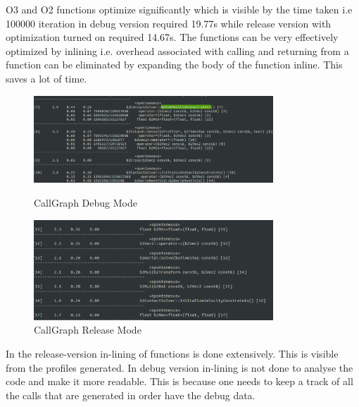 \documentclass[a4paper,11pt]{article}
\begin{document}
\begin{itemize}
O3 and O2 functions optimize significantly which is visible by the time taken i.e 100000 iteration in debug version required 19.77s while release version with optimization turned on required 14.67s.
The functions can be very effectively optimized by inlining i.e. overhead associated with calling and returning from a function can be eliminated by expanding the body of the function inline. This saves a lot of time.\\
\begin{figure}[ht]
	\begin{minipage}[ht]{0.5\linewidth}
	\includegraphics[width=90mm]{1.eps}
	\caption{CallGraph Debug Mode}	
	\end{minipage}	
	\begin{minipage}[ht]{0.5\linewidth}
	\includegraphics[width=90mm]{2.eps}
	\caption{CallGraph Release Mode}		
	\end{minipage}	
	\end{figure}

In the release-version in-lining of functions is done extensively. This is visible from the profiles generated. In debug version in-lining is not done to analyse the code and make it more readable. This is because one needs to keep a track of all the calls that are generated in order have the debug data.\\



\end{itemize}
\end{document}
